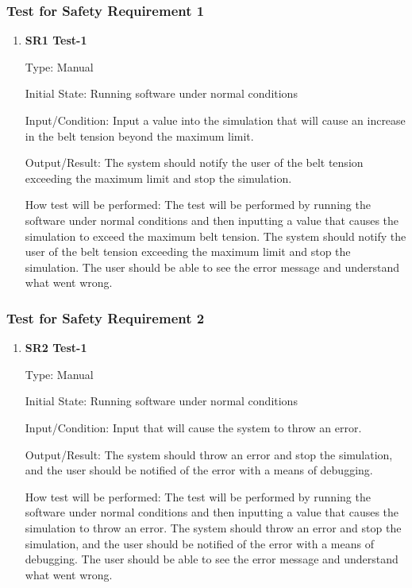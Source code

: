 \documentclass[12pt, titlepage]{article}
\begin{document}
\subsubsection{Test for Safety Requirement 1}
\begin{enumerate}

  \item {} \hypertarget{SR1 Test-1}{\textbf{SR1 Test-1}} \label{SR1 Test-1}
    
Type: Manual
              
Initial State: Running software under normal conditions
              
Input/Condition: Input a value into the simulation that will cause an increase in the belt tension beyond the maximum limit.
              
Output/Result: The system should notify the user of the belt tension exceeding the maximum limit and stop the simulation.
              
How test will be performed: The test will be performed by running the software under normal conditions and then inputting a value that causes the simulation to exceed the maximum belt tension.
The system should notify the user of the belt tension exceeding the maximum limit and stop the simulation. The user should be able to see the error message and understand what went wrong.
    

\end{enumerate}

\subsubsection{Test for Safety Requirement 2}
\begin{enumerate}

  \item {} \hypertarget{SR2 Test-1}{\textbf{SR2 Test-1}} \label{SR2 Test-1}
    
Type: Manual
              
Initial State: Running software under normal conditions
              
Input/Condition: Input that will cause the system to throw an error.
              
Output/Result: The system should throw an error and stop the simulation, and the user should be notified of the error with a means of debugging.
              
How test will be performed: The test will be performed by running the software under normal conditions and then inputting a value that causes the simulation to throw an error.
The system should throw an error and stop the simulation, and the user should be notified of the error with a means of debugging. The user should be able to see the error message and understand what went wrong.
    
\end{enumerate}
\end{document}
